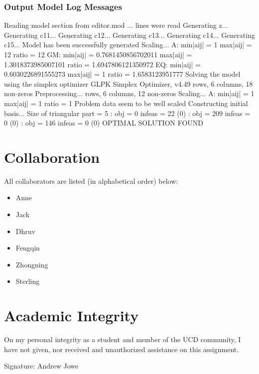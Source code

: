 \documentclass[14pt]{extarticle}
\begin{document}
\subsubsection*{Output Model Log Messages}
Reading model section from editor.mod ...
 lines were read
\newline Generating z...
\newline Generating c11...
\newline Generating c12...
\newline Generating c13...
\newline Generating c14...
\newline Generating c15...
\newline Model has been successfully generated
\newline Scaling...
\newline  A: min|aij| = 1  max|aij| = 12  ratio = 12
\newline GM: min|aij| = 0.7681450856702011  max|aij| = 1.3018373985007101  ratio = 1.6947806121350972
\newline EQ: min|aij| = 0.6030226891555273  max|aij| = 1  ratio = 1.6583123951777
\newline Solving the model using the simplex optimizer
\newline GLPK Simplex Optimizer, v4.49
 rows, 6 columns, 18 non-zeros
\newline Preprocessing...
 rows, 6 columns, 12 non-zeros
\newline Scaling...
\newline  A: min|aij| = 1  max|aij| = 1  ratio = 1
\newline Problem data seem to be well scaled
\newline Constructing initial basis...
\newline Size of triangular part = 5
: obj = 0  infeas = 22 (0)
: obj = 209  infeas = 0 (0)
: obj = 146  infeas = 0 (0)
\newline OPTIMAL SOLUTION FOUND

\section*{Collaboration}
All collaborators are listed (in alphabetical order) below:
\begin{itemize}
    \item Anne
    \item Jack
    \item Dhruv
    \item Fengqin
    \item Zhongning
    \item Sterling
\end{itemize}

\section*{Academic Integrity}
On my personal integrity as a student and member of the UCD community, I have not given, nor received and unauthorized assistance on this assignment.

Signature: Andrew Jowe
\end{document}
